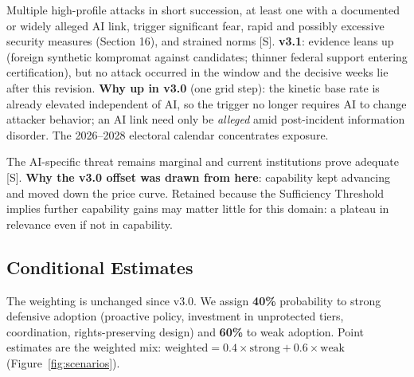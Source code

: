 \documentclass[11pt,letterpaper]{article}
\begin{document}
\begin{scenariobox}
Multiple high-profile attacks in short succession, at least one with a documented or widely alleged AI link, trigger significant fear, rapid and possibly excessive security measures (Section 16), and strained norms [S]. \textbf{v3.1}: evidence leans up (foreign synthetic kompromat against candidates; thinner federal support entering certification), but no attack occurred in the window and the decisive weeks lie after this revision. \textbf{Why up in v3.0} (one grid step): the kinetic base rate is already elevated independent of AI, so the trigger no longer requires AI to change attacker behavior; an AI link need only be \textit{alleged} amid post-incident information disorder. The 2026--2028 electoral calendar concentrates exposure.
\end{scenariobox}

\begin{scenariobox}
The AI-specific threat remains marginal and current institutions prove adequate [S]. \textbf{Why the v3.0 offset was drawn from here}: capability kept advancing and moved down the price curve. Retained because the Sufficiency Threshold implies further capability gains may matter little for this domain: a plateau in relevance even if not in capability.
\end{scenariobox}

\subsection{Conditional Estimates}

The weighting is unchanged since v3.0. We assign \textbf{40\%} probability to strong defensive adoption (proactive policy, investment in unprotected tiers, coordination, rights-preserving design) and \textbf{60\%} to weak adoption. Point estimates are the weighted mix: $\text{weighted} = 0.4 \times \text{strong} + 0.6 \times \text{weak}$ (Figure~\ref{fig:scenarios}).
\end{document}

